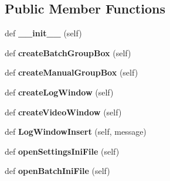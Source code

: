 \subsection*{Public Member Functions}
\begin{DoxyCompactItemize}
\item 
def {\bfseries \+\_\+\+\_\+init\+\_\+\+\_\+} (self)\hypertarget{classmain_1_1_main_window_a549bdaddd0d7706c191be4046a97e6a4}{}\label{classmain_1_1_main_window_a549bdaddd0d7706c191be4046a97e6a4}

\item 
def {\bfseries create\+Batch\+Group\+Box} (self)\hypertarget{classmain_1_1_main_window_ae88202654b0d2dc5a8cd9a084feda42b}{}\label{classmain_1_1_main_window_ae88202654b0d2dc5a8cd9a084feda42b}

\item 
def {\bfseries create\+Manual\+Group\+Box} (self)\hypertarget{classmain_1_1_main_window_aa530c2ace70f4005bc537852144ffa89}{}\label{classmain_1_1_main_window_aa530c2ace70f4005bc537852144ffa89}

\item 
def {\bfseries create\+Log\+Window} (self)\hypertarget{classmain_1_1_main_window_a1d31fceddfe3542524643421c8a1914b}{}\label{classmain_1_1_main_window_a1d31fceddfe3542524643421c8a1914b}

\item 
def {\bfseries create\+Video\+Window} (self)\hypertarget{classmain_1_1_main_window_a0df93bd420fe59ac3f37081c435a680c}{}\label{classmain_1_1_main_window_a0df93bd420fe59ac3f37081c435a680c}

\item 
def {\bfseries Log\+Window\+Insert} (self, message)\hypertarget{classmain_1_1_main_window_afbf24d2ebf30574e064ec0dc9fe8b612}{}\label{classmain_1_1_main_window_afbf24d2ebf30574e064ec0dc9fe8b612}

\item 
def {\bfseries open\+Settings\+Ini\+File} (self)\hypertarget{classmain_1_1_main_window_a507bab9e21bd54d2f62a2b6aad118cda}{}\label{classmain_1_1_main_window_a507bab9e21bd54d2f62a2b6aad118cda}

\item 
def {\bfseries open\+Batch\+Ini\+File} (self)\hypertarget{classmain_1_1_main_window_ad1d8728bfd272170bac703bcc65d0fd5}{}\label{classmain_1_1_main_window_ad1d8728bfd272170bac703bcc65d0fd5}

\end{DoxyCompactItemize}
